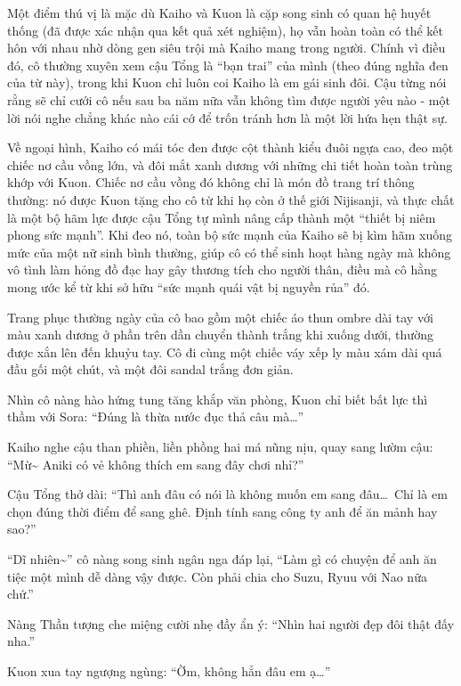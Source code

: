 \documentclass[../main.tex]{subfiles}
\begin{document}
Một điểm thú vị là mặc dù Kaiho và Kuon là cặp song sinh có quan hệ huyết thống (đã được xác nhận qua kết quả xét nghiệm), họ vẫn hoàn toàn có thể kết hôn với nhau nhờ dòng gen siêu trội mà Kaiho mang trong người. Chính vì điều đó, cô thường xuyên xem cậu Tổng là ``bạn trai'' của mình (theo đúng nghĩa đen của từ này), trong khi Kuon chỉ luôn coi Kaiho là em gái sinh đôi. Cậu từng nói rằng sẽ chỉ cưới cô nếu sau ba năm nữa vẫn không tìm được người yêu nào - một lời nói nghe chẳng khác nào cái cớ để trốn tránh hơn là một lời hứa hẹn thật sự.

Về ngoại hình, Kaiho có mái tóc đen được cột thành kiểu đuôi ngựa cao, đeo một chiếc nơ cầu vồng lớn, và đôi mắt xanh dương với những chi tiết hoàn toàn trùng khớp với Kuon. Chiếc nơ cầu vồng đó không chỉ là món đồ trang trí thông thường: nó được Kuon tặng cho cô từ khi họ còn ở thế giới Nijisanji, và thực chất là một bộ hãm lực được cậu Tổng tự mình nâng cấp thành một ``thiết bị niêm phong sức mạnh''. Khi đeo nó, toàn bộ sức mạnh của Kaiho sẽ bị kìm hãm xuống mức của một nữ sinh bình thường, giúp cô có thể sinh hoạt hàng ngày mà không vô tình làm hỏng đồ đạc hay gây thương tích cho người thân, điều mà cô hằng mong ước kể từ khi sở hữu ``sức mạnh quái vật bị nguyền rủa'' đó.

Trang phục thường ngày của cô bao gồm một chiếc áo thun ombre dài tay với màu xanh dương ở phần trên dần chuyển thành trắng khi xuống dưới, thường được xắn lên đến khuỷu tay. Cô đi cùng một chiếc váy xếp ly màu xám dài quá đầu gối một chút, và một đôi sandal trắng đơn giản.

\chrint

Nhìn cô nàng hào hứng tung tăng khắp văn phòng, Kuon chỉ biết bất lực thì thầm với Sora: ``Đúng là thừa nước đục thả câu mà\dots''

Kaiho nghe cậu than phiền, liền phồng hai má nũng nịu, quay sang lườm cậu: ``Mừ\~{} Aniki có vẻ không thích em sang đây chơi nhỉ?''

Cậu Tổng thở dài: ``Thì anh đâu có nói là không muốn em sang đâu\dots\ Chỉ là em chọn đúng thời điểm để sang ghê. Định tính sang công ty anh để ăn mảnh hay sao?''

``Dĩ nhiên\~{}'' cô nàng song sinh ngân nga đáp lại, ``Làm gì có chuyện để anh ăn tiệc một mình dễ dàng vậy được. Còn phải chia cho Suzu, Ryuu với Nao nữa chứ.''

Nàng Thần tượng che miệng cười nhẹ đầy ẩn ý: ``Nhìn hai người đẹp đôi thật đấy nha.''

Kuon xua tay ngượng ngùng: ``Ờm, không hẳn đâu em ạ\dots''
\end{document}

